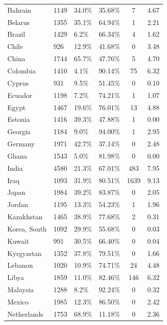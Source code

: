 \begin{longtable}[h!]{lC{1.6cm}C{1.6cm}C{1.6cm}cc}
Bahrain             & 1149 & 34.0\% & 35.68\% & 7    & 4.67 \\
Belarus             & 1355 & 35.1\% & 64.94\% & 1    & 2.21 \\
Brazil              & 1429 & 6.2\%  & 66.34\% & 4    & 1.62 \\
Chile               & 926  & 12.9\% & 41.68\% & 0    & 3.48 \\
China               & 1744 & 65.7\% & 47.76\% & 5    & 4.70 \\
Colombia            & 1410 & 4.1\%  & 90.14\% & 75   & 6.32 \\
Cyprus              & 931  & 9.5\%  & 51.45\% & 0    & 0.10 \\
Ecuador             & 1198 & 7.2\%  & 74.21\% & 1    & 1.07 \\
Egypt               & 1467 & 19.6\% & 76.01\% & 13   & 4.88 \\
Estonia             & 1416 & 39.3\% & 47.88\% & 1    & 0.00 \\
Georgia             & 1184 & 9.0\%  & 94.00\% & 1    & 2.95 \\
Germany             & 1971 & 42.7\% & 37.14\% & 0    & 2.48 \\
Ghana               & 1543 & 5.0\%  & 81.98\% & 0    & 0.00 \\
India               & 4580 & 21.3\% & 67.01\% & 483  & 7.95 \\
Iraq                & 1093 & 31.9\% & 80.51\% & 1639 & 9.13 \\
Japan               & 1984 & 39.2\% & 83.87\% & 0    & 2.05 \\
Jordan              & 1195 & 13.3\% & 54.23\% & 1    & 1.96 \\
Kazakhstan          & 1465 & 38.9\% & 77.68\% & 2    & 0.31 \\
Korea, South        & 1092 & 29.9\% & 55.68\% & 0    & 0.03 \\
Kuwait              & 991  & 30.5\% & 66.40\% & 0    & 0.04 \\
Kyrgyzstan          & 1352 & 37.8\% & 79.51\% & 0    & 1.66 \\
Lebanon             & 1020 & 10.9\% & 74.71\% & 24   & 4.48 \\
Libya               & 1859 & 11.0\% & 82.46\% & 146  & 6.32 \\
Malaysia            & 1288 & 8.2\%  & 92.24\% & 0    & 0.32 \\
Mexico              & 1985 & 12.3\% & 86.50\% & 0    & 2.42 \\
Netherlands         & 1753 & 68.9\% & 11.18\% & 0    & 2.36 \\

\end{longtable}
